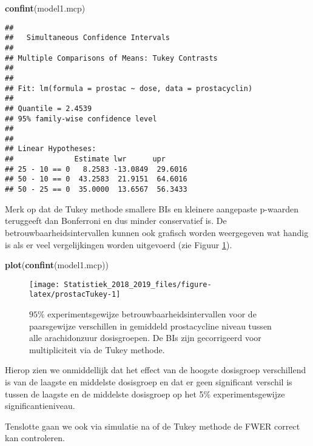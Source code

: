 \documentclass[12pt,dutch,coursenotes]{book}
\newenvironment{Shaded}{\begin{snugshade}}{\end{snugshade}}
\newcommand{\KeywordTok}[1]{\textcolor[rgb]{0.13,0.29,0.53}{\textbf{#1}}}
\newcommand{\NormalTok}[1]{#1}
\theoremstyle{definition}
\theoremstyle{definition}
\theoremstyle{definition}
\theoremstyle{remark}
\begin{document}
\begin{Shaded}
\begin{Highlighting}[]
\KeywordTok{confint}\NormalTok{(model1.mcp)}
\end{Highlighting}
\end{Shaded}

\begin{verbatim}
## 
##   Simultaneous Confidence Intervals
## 
## Multiple Comparisons of Means: Tukey Contrasts
## 
## 
## Fit: lm(formula = prostac ~ dose, data = prostacyclin)
## 
## Quantile = 2.4539
## 95% family-wise confidence level
##  
## 
## Linear Hypotheses:
##              Estimate lwr      upr     
## 25 - 10 == 0   8.2583 -13.0849  29.6016
## 50 - 10 == 0  43.2583  21.9151  64.6016
## 50 - 25 == 0  35.0000  13.6567  56.3433
\end{verbatim}

Merk op dat de Tukey methode smallere BIs en kleinere aangepaste
p-waarden teruggeeft dan Bonferroni en dus minder conservatief is. De
betrouwbaarheidsintervallen kunnen ook grafisch worden weergegeven wat
handig is als er veel vergelijkingen worden uitgevoerd (zie Figuur
\ref{fig:prostacTukey}).

\begin{Shaded}
\begin{Highlighting}[]
\KeywordTok{plot}\NormalTok{(}\KeywordTok{confint}\NormalTok{(model1.mcp))}
\end{Highlighting}
\end{Shaded}

\begin{figure}

{\centering \texttt{[image: Statistiek\_2018\_2019\_files/figure-latex/prostacTukey-1]} 

}

\caption{$95\%$ experimentsgewijze betrouwbaarheidsintervallen voor de paarsgewijze verschillen in gemiddeld prostacycline niveau tussen alle arachidonzuur dosisgroepen. De BIs zijn gecorrigeerd voor multipliciteit via de Tukey methode.}\label{fig:prostacTukey}
\end{figure}

Hierop zien we onmiddellijk dat het effect van de hoogste dosisgroep
verschillend is van de laagste en middelste dosisgroep en dat er geen
significant verschil is tussen de laagste en de middelste dosisgroep op
het 5\% experimentsgewijze significantieniveau.

Tenslotte gaan we ook via simulatie na of de Tukey methode de FWER
correct kan controleren.
\end{document}
